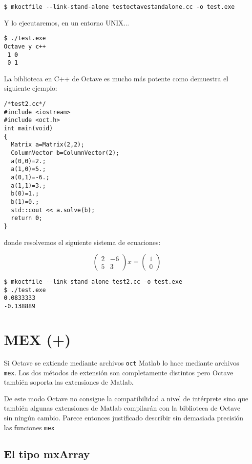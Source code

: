 \begin{verbatim}
$ mkoctfile --link-stand-alone testoctavestandalone.cc -o test.exe
\end{verbatim}
Y lo ejecutaremos, en un entorno UNIX...

\begin{verbatim}
$ ./test.exe
Octave y c++
 1 0
 0 1
\end{verbatim}

La biblioteca en C++ de Octave es mucho más potente como demuestra el
siguiente ejemplo:

\begin{verbatim}
/*test2.cc*/
#include <iostream>
#include <oct.h>
int main(void)
{
  Matrix a=Matrix(2,2);
  ColumnVector b=ColumnVector(2);
  a(0,0)=2.;
  a(1,0)=5.;
  a(0,1)=-6.;
  a(1,1)=3.;
  b(0)=1.;
  b(1)=0.;
  std::cout << a.solve(b);
  return 0;
}
\end{verbatim}
donde resolvemos el siguiente sistema de ecuaciones:

$$
\left(\begin{array}{cc}
    2 & -6\\
    5 & 3\end{array}\right)x= \left(\begin{array}{c}
    1\\
    0\end{array}\right)$$


\begin{verbatim}
$ mkoctfile --link-stand-alone test2.cc -o test.exe
$ ./test.exe 
0.0833333 
-0.138889 
\end{verbatim}

\section{MEX  (+)}

Si Octave se extiende mediante archivos \texttt{oct} Matlab lo hace
mediante archivos \texttt{mex}. Los dos métodos de extensión son
completamente distintos pero Octave también soporta las extensiones de
Matlab.

De este modo Octave no consigue la compatibilidad a nivel de
intérprete sino que también algunas extensiones de Matlab compilarán
con la biblioteca de Octave sin ningún cambio. Parece entonces
justificado describir sin demasiada precisión las funciones
\texttt{mex}


\subsection{El tipo mxArray}

